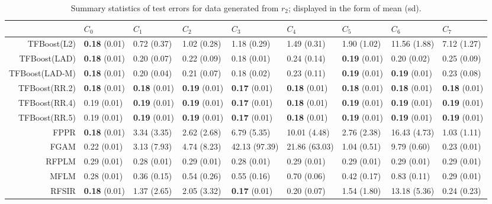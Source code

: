\begin{table}[H]
\centering
\begin{tabular}{rllllllll}
  \hline
 & $C_0$ & $C_1$ & $C_2$ & $C_3$ & $C_4$ & $C_5$ & $C_6$ & $C_7$ \\ 
  \hline
TFBoost(L2) & \textbf{0.18} (0.01) & 0.72 (0.37) & 1.02 (0.28) & 1.18 (0.29) & 1.49 (0.31) & 1.90 (1.02) & 11.56 (1.88) & 7.12 (1.27) \\ 
  TFBoost(LAD) & \textbf{0.18} (0.01) & 0.20 (0.07) & 0.22 (0.09) & 0.18 (0.01) & 0.24 (0.14) & \textbf{0.19} (0.01) & 0.20 (0.02) & 0.25 (0.09) \\ 
  TFBoost(LAD-M) & \textbf{0.18} (0.01) & 0.20 (0.04) & 0.21 (0.07) & 0.18 (0.02) & 0.23 (0.11) & \textbf{0.19} (0.01) & \textbf{0.19} (0.01) & 0.23 (0.08) \\ 
  TFBoost(RR.2) & \textbf{0.18} (0.01) & \textbf{0.18} (0.01) & \textbf{0.19} (0.01) & \textbf{0.17} (0.01) & \textbf{0.18} (0.01) & \textbf{0.18} (0.01) & \textbf{0.18} (0.01) & \textbf{0.18} (0.01) \\ 
  TFBoost(RR.4) & 0.19 (0.01) & \textbf{0.19} (0.01) & \textbf{0.19} (0.01) & \textbf{0.17} (0.01) & \textbf{0.18} (0.01) & \textbf{0.19} (0.01) & \textbf{0.19} (0.01) & \textbf{0.19} (0.01) \\ 
  TFBoost(RR.5) & 0.19 (0.01) & \textbf{0.19} (0.01) & \textbf{0.19} (0.01) & \textbf{0.17} (0.01) & \textbf{0.18} (0.01) & \textbf{0.19} (0.01) & \textbf{0.19} (0.01) & \textbf{0.19} (0.01) \\ 
  FPPR & \textbf{0.18} (0.01) & 3.34 (3.35) & 2.62 (2.68) & 6.79 (5.35) & 10.01 (4.48) & 2.76 (2.38) & 16.43 (4.73) & 1.03 (1.11) \\ 
  FGAM & 0.22 (0.01) & 3.13 (7.93) & 4.74 (8.23) & 42.13 (97.39) & 21.86 (63.03) & 1.04 (0.51) & 9.79 (0.60) & 0.23 (0.01) \\ 
  RFPLM & 0.29 (0.01) & 0.28 (0.01) & 0.29 (0.01) & 0.28 (0.01) & 0.29 (0.01) & 0.29 (0.01) & 0.29 (0.01) & 0.29 (0.01) \\ 
  MFLM & 0.28 (0.01) & 0.36 (0.15) & 0.54 (0.26) & 0.55 (0.16) & 0.70 (0.06) & 0.42 (0.17) & 0.83 (0.11) & 0.29 (0.01) \\ 
  RFSIR & \textbf{0.18} (0.01) & 1.37 (2.65) & 2.05 (3.32) & \textbf{0.17} (0.01) & 0.20 (0.07) & 1.54 (1.80) & 13.18 (5.36) & 0.24 (0.23) \\ 
   \hline
\end{tabular}
\caption{Summary statistics of test errors for data generated from $r_2$; displayed in the form of mean (sd).} 
\end{table}
